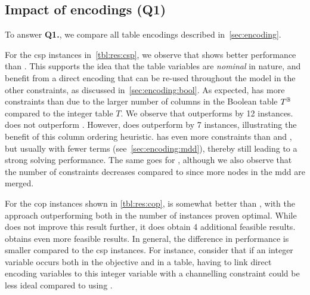 \documentclass[a4paper,UKenglish,cleveref,autoref,thm-restate]{lipics-v2021}
\begin{document}
\newcommand{\tableCaption}{
Overview of results.
The reported statuses are \pst for linearizing and posting the model, \sat for finding a feasible solution, or \sol for solved (\ie reported unsatisfiable, or \sat for \glspl{csp}, or optimal for \glspl{cop}), within the time- and memory limit.
We report the average solve time (including encode/post time) over all instances, with a PAR2 penalty for unsolved instances.
We also show the average number of constraints required to encode the instances which were successfully posted by all approaches, and the average number of cuts to solve instances which were solved by all lazy approaches.
The best result for the various columns is shown in \textbf{bold}.
}


\subsection{Impact of encodings (Q1)}

To answer \textbf{Q1.}, we compare all table encodings described in~\cref{sec:encoding}.

For the \gls{csp} instances in~\cref{tbl:res:csp}, we observe that \baseBool shows better performance than \baseGleb.
This supports the idea that the table variables are \textit{nominal} in nature, and benefit from a direct encoding that can be re-used throughout the model in the other constraints, as discussed in~\cref{sec:encoding:bool}.
As expected, \baseBool has more constraints than \baseGleb due to the larger number of columns in the Boolean table $T^{\mathbb{B}}$ compared to the integer table $T$.
We observe that \baseMddInput outperforms \baseGleb by 12 instances.
\baseMddInput does not outperform \baseBool.
However, \baseMddDomIncr does outperform \baseBool by 7 instances, illustrating the benefit of this column ordering heuristic.
\baseMddInput has even more constraints than \baseGleb and \baseBool, but usually with fewer terms (see~\cref{sec:encoding:mdd}), thereby still leading to a strong solving performance.
The same goes for \baseMddDomIncr, although we also observe that the number of constraints decreases compared to \baseMddInput since more nodes in the \gls{mdd} are merged.

For the \gls{cop} instances shown in \cref{tbl:res:cop}, \baseGleb is somewhat better than \baseBool, with the \baseMddInput approach outperforming both in the number of instances proven optimal.
While \baseMddDomIncr does not improve this result further, it does obtain 4 additional feasible results.
\baseGleb obtains even more feasible results.
In general, the difference in performance is smaller compared to the \gls{csp} instances.
For instance, consider that if an integer variable occurs both in the objective and in a table, having to link direct encoding variables to this integer variable with a channelling constraint could be less ideal compared to using \baseGleb.
\end{document}

